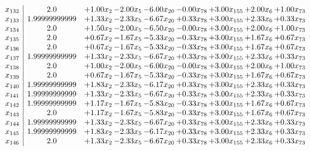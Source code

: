\documentclass[8pt]{article}
\begin{document}
\[\begin{array}{c| c c@{\hskip 2pt} c@{\hskip 2pt} c@{\hskip 2pt} c@{\hskip 2pt} c@{\hskip 2pt} c@{\hskip 2pt} c@{\hskip 2pt} }
 x_{132}   &  2.0 & +  1.00 x_{2} & -2.00 x_{5} & -6.00 x_{20} & -0.00 x_{78} & +  3.00 x_{155} & +  2.00 x_{6} & +  1.00 x_{73}\\
 x_{133}   &  1.99999999999 & +  1.33 x_{2} & -2.33 x_{5} & -6.67 x_{20} & +  0.33 x_{78} & +  3.00 x_{155} & +  2.33 x_{6} & +  0.33 x_{73}\\
 x_{134}   &  2.0 & +  1.50 x_{2} & -2.00 x_{5} & -6.50 x_{20} & -0.00 x_{78} & +  3.00 x_{155} & +  2.00 x_{6} & +  1.00 x_{73}\\
 x_{135}   &  2.0 & +  0.67 x_{2} & -1.67 x_{5} & -5.33 x_{20} & -0.33 x_{78} & +  3.00 x_{155} & +  1.67 x_{6} & +  0.67 x_{73}\\
 x_{136}   &  2.0 & +  0.67 x_{2} & -1.67 x_{5} & -5.33 x_{20} & -0.33 x_{78} & +  3.00 x_{155} & +  1.67 x_{6} & +  0.67 x_{73}\\
 x_{137}   &  1.99999999999 & +  1.33 x_{2} & -2.33 x_{5} & -6.67 x_{20} & +  0.33 x_{78} & +  3.00 x_{155} & +  2.33 x_{6} & +  0.33 x_{73}\\
 x_{138}   &  2.0 & +  1.00 x_{2} & -2.00 x_{5} & -6.00 x_{20} & -0.00 x_{78} & +  3.00 x_{155} & +  2.00 x_{6} & +  1.00 x_{73}\\
 x_{139}   &  2.0 & +  0.67 x_{2} & -1.67 x_{5} & -5.33 x_{20} & -0.33 x_{78} & +  3.00 x_{155} & +  1.67 x_{6} & +  0.67 x_{73}\\
 x_{140}   &  1.99999999999 & +  1.83 x_{2} & -2.33 x_{5} & -6.17 x_{20} & +  0.33 x_{78} & +  3.00 x_{155} & +  2.33 x_{6} & +  0.33 x_{73}\\
 x_{141}   &  1.99999999999 & +  1.33 x_{2} & -2.33 x_{5} & -6.67 x_{20} & +  0.33 x_{78} & +  3.00 x_{155} & +  2.33 x_{6} & +  0.33 x_{73}\\
 x_{142}   &  1.99999999999 & +  1.17 x_{2} & -1.67 x_{5} & -5.83 x_{20} & -0.33 x_{78} & +  3.00 x_{155} & +  1.67 x_{6} & +  0.67 x_{73}\\
 x_{143}   &  2.0 & +  1.17 x_{2} & -1.67 x_{5} & -5.83 x_{20} & -0.33 x_{78} & +  3.00 x_{155} & +  1.67 x_{6} & +  0.67 x_{73}\\
 x_{144}   &  1.99999999999 & +  1.33 x_{2} & -2.33 x_{5} & -6.67 x_{20} & +  0.33 x_{78} & +  3.00 x_{155} & +  2.33 x_{6} & +  0.33 x_{73}\\
 x_{145}   &  1.99999999999 & +  1.83 x_{2} & -2.33 x_{5} & -6.17 x_{20} & +  0.33 x_{78} & +  3.00 x_{155} & +  2.33 x_{6} & +  0.33 x_{73}\\
 x_{146}   &  2.0 & +  1.33 x_{2} & -2.33 x_{5} & -6.67 x_{20} & +  0.33 x_{78} & +  3.00 x_{155} & +  2.33 x_{6} & +  0.33 x_{73}\\

\end{array}\]
\end{document}
